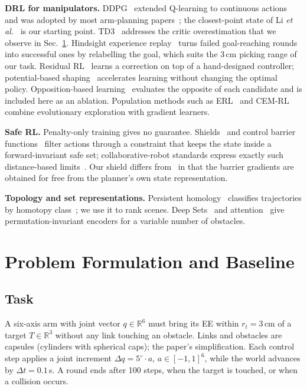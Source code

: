 \documentclass[conference]{IEEEtran}
\begin{document}
\textbf{DRL for manipulators.} DDPG~\cite{lillicrap2016ddpg} extended Q-learning to continuous actions and was adopted by most arm-planning papers~\cite{li2024ddpg,liu2022expert,zheng2023efficient,lin2021guava}; the closest-point state of Li \emph{et al.}~\cite{li2024ddpg} is our starting point. TD3~\cite{fujimoto2018td3} addresses the critic overestimation that we observe in Sec.~\ref{sec:baseline}. Hindsight experience replay~\cite{andrychowicz2017her} turns failed goal-reaching rounds into successful ones by relabelling the goal, which suits the 3\,cm picking range of our task. Residual RL~\cite{johannink2019residual} learns a correction on top of a hand-designed controller; potential-based shaping~\cite{ng1999shaping} accelerates learning without changing the optimal policy. Opposition-based learning~\cite{tizhoosh2005obl,rahnamayan2008ode} evaluates the opposite of each candidate and is included here as an ablation. Population methods such as ERL~\cite{khadka2018erl} and CEM-RL~\cite{pourchot2019cemrl} combine evolutionary exploration with gradient learners.

\textbf{Safe RL.} Penalty-only training gives no guarantee. Shields~\cite{alshiekh2018shielding} and control barrier functions~\cite{ames2019cbf,cheng2019endtoend} filter actions through a constraint that keeps the state inside a forward-invariant safe set; collaborative-robot standards express exactly such distance-based limits~\cite{iso15066}. Our shield differs from~\cite{cheng2019endtoend} in that the barrier gradients are obtained for free from the planner's own state representation.

\textbf{Topology and set representations.} Persistent homology~\cite{edelsbrunner2010topology} classifies trajectories by homotopy class~\cite{bhattacharya2012homotopy,pokorny2016topological}; we use it to rank scenes. Deep Sets~\cite{zaheer2017deepsets} and attention~\cite{vaswani2017attention} give permutation-invariant encoders for a variable number of obstacles.

\section{Problem Formulation and Baseline}\label{sec:baseline}
\subsection{Task}
A six-axis arm with joint vector $q\in\mathbb{R}^6$ must bring its EE within $r_t=3$\,cm of a target $T\in\mathbb{R}^3$ without any link touching an obstacle. Links and obstacles are capsules (cylinders with spherical caps); the paper's simplification. Each control step applies a joint increment $\Delta q=5^\circ\cdot a$, $a\in[-1,1]^6$, while the world advances by $\Delta t=0.1$\,s. A round ends after 100 steps, when the target is touched, or when a collision occurs.
\end{document}
